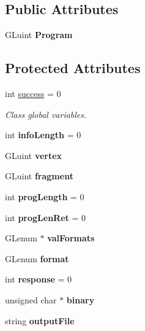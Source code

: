 \subsection*{Public Attributes}
\begin{DoxyCompactItemize}
\item 
\mbox{\label{classShader_a51b23253846bc84dcc2ef06612679012}} 
G\+Luint {\bfseries Program}
\end{DoxyCompactItemize}
\subsection*{Protected Attributes}
\begin{DoxyCompactItemize}
\item 
\mbox{\label{classShader_aa92ac3efc16e935cc187bb1fa2de3c1d}} 
int \hyperlink{classShader_aa92ac3efc16e935cc187bb1fa2de3c1d}{success} = 0
\begin{DoxyCompactList}\small\item\em Class global variables. \end{DoxyCompactList}\item 
\mbox{\label{classShader_a925980c85cb0feec42bcb6ccbca462fc}} 
int {\bfseries info\+Length} = 0
\item 
\mbox{\label{classShader_a0563120d6a835ba8b499c62d40aa6902}} 
G\+Luint {\bfseries vertex}
\item 
\mbox{\label{classShader_a19fa1778514d32b2f756add50277697e}} 
G\+Luint {\bfseries fragment}
\item 
\mbox{\label{classShader_a97110ef268966a801e052ef65c1fffee}} 
int {\bfseries prog\+Length} = 0
\item 
\mbox{\label{classShader_a2938fe62f4ab9a08c0aa5bec961eb6f8}} 
int {\bfseries prog\+Len\+Ret} = 0
\item 
\mbox{\label{classShader_a31ee1c56c35582104dbf901e47351b2d}} 
G\+Lenum $\ast$ {\bfseries val\+Formats}
\item 
\mbox{\label{classShader_a5e9246c5b3e23cb488511799b834372f}} 
G\+Lenum {\bfseries format}
\item 
\mbox{\label{classShader_af712293fbaca66f0b0de142e82f16420}} 
int {\bfseries response} = 0
\item 
\mbox{\label{classShader_a461d70dc51197c6709cacc07a14babb7}} 
unsigned char $\ast$ {\bfseries binary}
\item 
\mbox{\label{classShader_acafe54560442b48deef8614570e1f946}} 
string {\bfseries output\+File}
\end{DoxyCompactItemize}


